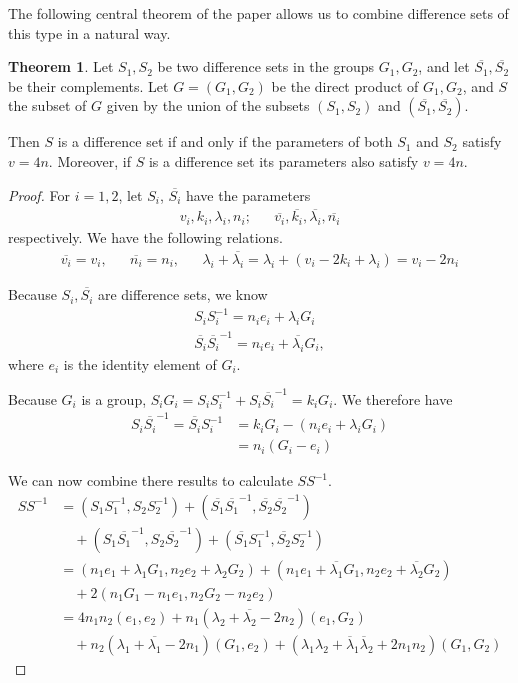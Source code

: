\documentclass[12pt,a4paper]{article}
\theoremstyle{definition}
\newtheorem{theorem}{Theorem}[section]
\begin{document}
The following central theorem of the paper allows us to combine difference sets of this type in a natural way.

\begin{theorem}
Let $S_1, S_2$ be two difference sets in the groups $G_1, G_2$, and let $\overline{S_1}, \overline{S_2}$ be their complements. Let $G=(G_1, G_2)$ be the direct product of $G_1, G_2$, and $S$ the subset of $G$ given by the union of the subsets $(S_1, S_2)$ and $(\overline{S_1}, \overline{S_2})$.

Then $S$ is a difference set if and only if the parameters of both $S_1$ and $S_2$ satisfy $v=4n$. Moreover, if $S$ is a difference set its parameters also satisfy $v=4n$.
\end{theorem}
\begin{proof}
For $i = 1,2$, let $S_i$, $\overline{S_i}$ have the parameters
\begin{align*}
v_i, k_i, \lambda_i, n_i; && \overline{v_i}, \overline{k_i}, \overline{\lambda_i}, \overline{n_i}
\end{align*}
respectively. We have the following relations.
\begin{align*}
\overline{v_i} = v_i, && \overline{n_i} = n_i, && \lambda_i + \overline{\lambda_i} = \lambda_i + (v_i-2k_i+\lambda_i) = v_i - 2n_i
\end{align*}

Because $S_i, \overline{S_i}$ are difference sets, we know
\begin{align*}
S_i S_i^{-1} = n_i e_i + \lambda_i G_i \\
\overline{S_i} \overline{S_i}^{-1} = n_i e_i + \overline{\lambda_i} G_i,
\end{align*} 
where $e_i$ is the identity element of $G_i$.

Because $G_i$ is a group, $S_i G_i = S_i S_i^{-1} + S_i \overline{S_i}^{-1} = k_i G_i$. We therefore have
\begin{align*}
S_i \overline{S_i}^{-1} = \overline{S_i} S_i^{-1} &= k_i G_i - (n_i e_i + \lambda_i G_i) \\
&= n_i (G_i - e_i)
\end{align*}

We can now combine there results to calculate $S S^{-1}$.
\begin{align*}
S S^{-1} &= (S_1 S_1^{-1}, S_2 S_2^{-1}) + (\overline{S_1}\overline{S_1}^{-1}, \overline{S_2} \overline{S_2}^{-1}) \\ 
& \quad + (S_1 \overline{S_1}^{-1}, S_2 \overline{S_2}^{-1}) + (\overline{S_1} S_1^{-1}, \overline{S_2} S_2^{-1}) \\
&= (n_1 e_1 + \lambda_1 G_1, n_2 e_2 + \lambda_2 G_2) + 
(n_1 e_1 + \overline{\lambda_1} G_1, n_2 e_2 + \overline{\lambda_2} G_2) \\
& \quad + 2(n_1 G_1 - n_1 e_1, n_2 G_2 - n_2 e_2) \\
&= 4 n_1 n_2 (e_1, e_2) + n_1(\lambda_2 + \overline{\lambda_2} - 2 n_2) (e_1, G_2) \\
& \quad + n_2(\lambda_1 + \overline{\lambda_1} - 2 n_1) (G_1, e_2) + (\lambda_1 \lambda_2 + \overline{\lambda}_1 \overline{\lambda}_2 + 2 n_1 n_2) (G_1, G_2)
\end{align*}


\end{proof}
\end{document}
